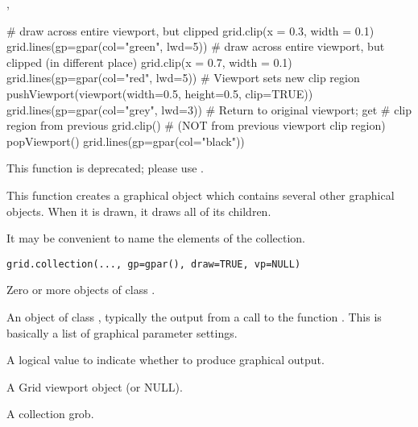 %
\begin{SeeAlso}\relax
{},
\end{SeeAlso}
%
\begin{Examples}
\begin{ExampleCode}
# draw across entire viewport, but clipped
grid.clip(x = 0.3, width = 0.1)
grid.lines(gp=gpar(col="green", lwd=5))
# draw across entire viewport, but clipped (in different place)
grid.clip(x = 0.7, width = 0.1)
grid.lines(gp=gpar(col="red", lwd=5))
# Viewport sets new clip region
pushViewport(viewport(width=0.5, height=0.5, clip=TRUE))
grid.lines(gp=gpar(col="grey", lwd=3))
# Return to original viewport;  get 
# clip region from previous grid.clip()
# (NOT from previous viewport clip region)
popViewport()
grid.lines(gp=gpar(col="black"))
\end{ExampleCode}
\end{Examples}
%
\begin{Description}\relax
This function is deprecated; please use .

This function creates a graphical object which contains
several other graphical objects.  When it is drawn, it draws
all of its children.  

It may be convenient to name the elements of the collection.
\end{Description}
%
\begin{Usage}
\begin{verbatim}
grid.collection(..., gp=gpar(), draw=TRUE, vp=NULL)
\end{verbatim}
\end{Usage}
%
\begin{Arguments}
\begin{ldescription}
\item[\code{...}] Zero or more objects of class .
\item[\code{gp}] An object of class , typically the output
from a call to the function .  This is basically
a list of graphical parameter settings.
\item[\code{draw}] A logical value to indicate whether to produce
graphical output.
\item[\code{vp}] A Grid viewport object (or NULL).
\end{ldescription}
\end{Arguments}
%
\begin{Value}
A collection grob.
\end{Value}
